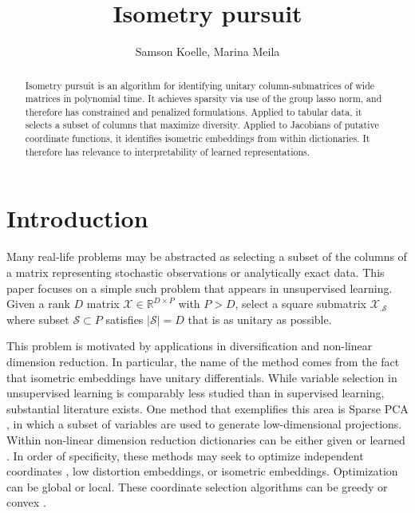\documentclass[a4paper,11pt]{article}
\begin{document}
\title{Isometry pursuit}
\author{Samson Koelle, Marina Meila}

\maketitle

\begin{abstract}

Isometry pursuit is an algorithm for identifying unitary column-submatrices of wide matrices in polynomial time. %
It achieves sparsity via use of the group lasso norm, and therefore has constrained and penalized formulations.
Applied to tabular data, it selects a subset of columns that maximize diversity.
Applied to Jacobians of putative coordinate functions, it identifies isometric embeddings from within dictionaries.
It therefore has relevance to interpretability of learned representations.

\end{abstract}

\section{Introduction}
\label{sec:introduction}

Many real-life problems may be abstracted as selecting a subset of the columns of a matrix representing stochastic observations or analytically exact data.
This paper focuses on a simple such problem that appears in unsupervised learning.
Given a rank $D$ matrix $\mathcal X \in \mathbb R^{D \times P}$ with $P > D$, select a square submatrix $\mathcal X_{.\mathcal S}$ where subset $\mathcal S \subset P$ satisfies $|\mathcal S| = D$ that is as unitary as possible.

This problem is motivated by applications in diversification and non-linear dimension reduction.
In particular, the name of the method comes from the fact that isometric embeddings have unitary differentials.
While variable selection in unsupervised learning is comparably less studied than in supervised learning, substantial literature exists.
One method that exemplifies this area is Sparse PCA \cite{Dey2017-mx}, in which a subset of variables are used to generate low-dimensional projections.
Within non-linear dimension reduction dictionaries can be either given \cite{Koelle2022-ju, Koelle2024-no} or learned \cite{Kohli2021-lr}. 
In order of specificity, these methods may seek to optimize independent coordinates \cite{Chen2019-km, He2023-ch}, low distortion embeddings, or isometric embeddings.
Optimization can be global or local.
These coordinate selection algorithms can be greedy \cite{NEURIPS2019_6a10bbd4, Kohli2021-lr, Jones2007-uc} or convex \cite{Koelle2022-ju, Koelle2024-no}.
\end{document}
